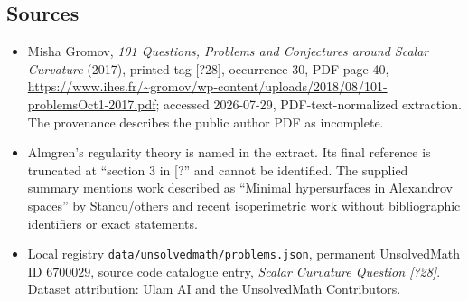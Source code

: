\documentclass[11pt]{article}
\begin{document}
\subsection{Sources}
\begin{itemize}
\item Misha Gromov, \emph{101 Questions, Problems and Conjectures around Scalar Curvature} (2017), printed tag [?28], occurrence 30, PDF page 40, \url{https://www.ihes.fr/~gromov/wp-content/uploads/2018/08/101-problemsOct1-2017.pdf}; accessed 2026-07-29, PDF-text-normalized extraction. The provenance describes the public author PDF as incomplete.
\item Almgren's regularity theory is named in the extract. Its final reference is truncated at ``section 3 in [?'' and cannot be identified. The supplied summary mentions work described as ``Minimal hypersurfaces in Alexandrov spaces'' by Stancu/others and recent isoperimetric work without bibliographic identifiers or exact statements.
\item Local registry \texttt{data/unsolvedmath/problems.json}, permanent UnsolvedMath ID $6700029$, source code catalogue entry, \emph{Scalar Curvature Question [?28]}. Dataset attribution: Ulam AI and the UnsolvedMath Contributors.
\end{itemize}
\end{document}
